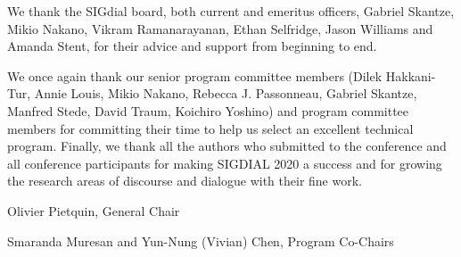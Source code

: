 We thank the SIGdial board, both current and emeritus officers, Gabriel Skantze, Mikio Nakano, Vikram Ramanarayanan, Ethan Selfridge, Jason Williams and Amanda Stent, for their advice and support from beginning to end.

We once again thank our senior program committee members (Dilek Hakkani-Tur,    Annie Louis, Mikio Nakano, Rebecca J. Passonneau, Gabriel Skantze,  Manfred Stede, David Traum, Koichiro Yoshino) and program committee members for committing their time to help us select an excellent technical program. Finally, we thank all the authors who submitted to the conference and all conference participants for making SIGDIAL 2020 a success and for growing the research areas of discourse and dialogue with their fine work.


Olivier Pietquin, General Chair

Smaranda Muresan and Yun-Nung (Vivian) Chen, Program Co-Chairs
